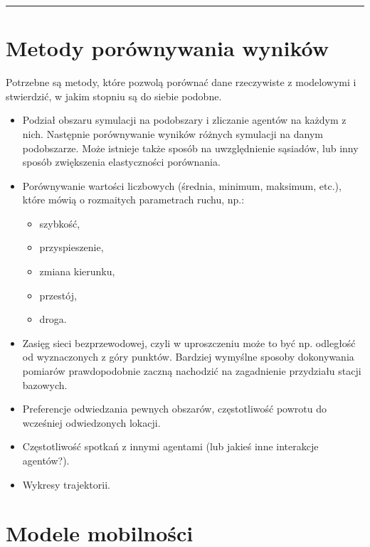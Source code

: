 \documentclass[a4paper,12pt]{article}
\begin{document}
\tableofcontents

\vspace{0.5cm}
\hrule

\section{Metody porównywania wyników}

Potrzebne są metody, które pozwolą porównać dane rzeczywiste z modelowymi i stwierdzić, w jakim stopniu są do siebie podobne.

\begin{itemize}
    \item Podział obszaru symulacji na podobszary i zliczanie agentów na każdym z nich. Następnie porównywanie wyników różnych symulacji na danym podobszarze. Może istnieje także sposób na uwzględnienie sąsiadów, lub inny sposób zwiększenia elastyczności porównania.

    \item Porównywanie wartości liczbowych (średnia, minimum, maksimum, etc.), które mówią o rozmaitych parametrach ruchu, np.:
    \begin{itemize}
        \item szybkość,
        \item przyspieszenie,
        \item zmiana kierunku,
        \item przestój,
        \item droga.
    \end{itemize}

    \item Zasięg sieci bezprzewodowej, czyli w uproszczeniu może to być np. odległość od wyznaczonych z góry punktów. Bardziej wymyślne sposoby dokonywania pomiarów prawdopodobnie zaczną nachodzić na zagadnienie przydziału stacji bazowych.

    \item Preferencje odwiedzania pewnych obszarów, częstotliwość powrotu do wcześniej odwiedzonych lokacji.

    \item Częstotliwość spotkań z innymi agentami (lub jakieś inne interakcje agentów?).

    \item Wykresy trajektorii.
\end{itemize}

\pagebreak

\section{Modele mobilności}
\end{document}
